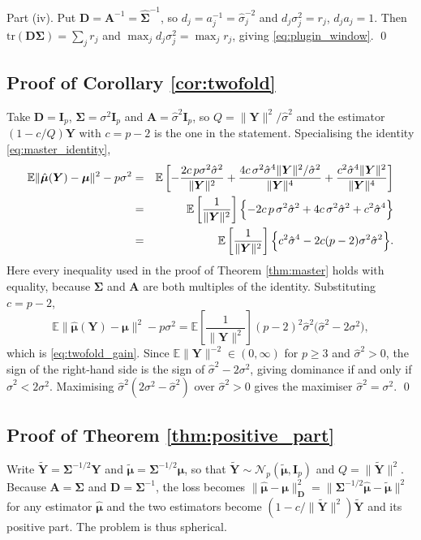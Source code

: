 \documentclass[pdflatex,sn-mathphys-num]{sn-jnl}%
\theoremstyle{thmstyleone}%
\theoremstyle{thmstyletwo}%
\theoremstyle{thmstylethree}%
\newcommand{\tr}{\mathrm{tr}}
\newcommand{\E}{\mathbb{E}}
\begin{document}
\begin{appendices}
Part (iv). Put $\bm D=\bm A^{-1}=\widehat{\bm\Sigma}^{-1}$, so $d_j=a^{-1}_j=\hat\sigma^{-2}_j$ and $d_j\sigma^2_j=r_j$, $d_ja_j=1$. Then $\tr(\bm D\bm\Sigma)=\sum_jr_j$ and $\max_jd_j\sigma^2_j=\max_jr_j$, giving \eqref{eq:plugin_window}. \qed

\subsection*{Proof of Corollary \ref{cor:twofold}}

Take $\bm D=\bm I_p$, $\bm\Sigma=\sigma^2\bm I_p$ and $\bm A=\hat\sigma^2\bm I_p$, so $Q=\|\bm Y\|^2/\hat\sigma^2$ and the estimator $(1-c/Q)\bm Y$ with $c=p-2$ is the one in the statement. Specialising the identity \eqref{eq:master_identity},
\begin{eqnarray}
\E\|\hat{\bm\mu}(\bm Y)-\bm\mu\|^2-p\sigma^2
&=&
\E\left[
-\frac{2c\,p\sigma^2\hat\sigma^2}{\|\bm Y\|^2}
+\frac{4c\,\sigma^2\hat\sigma^{4}\|\bm Y\|^2/\hat\sigma^2}{\|\bm Y\|^{4}}
+\frac{c^{2}\hat\sigma^{4}\|\bm Y\|^2}{\|\bm Y\|^{4}}
\right]
\cr
&=&
\E\left[\frac{1}{\|\bm Y\|^2}\right]
\Bigl\{
-2c\,p\,\sigma^2\hat\sigma^2+4c\,\sigma^2\hat\sigma^2+c^{2}\hat\sigma^{4}
\Bigr\}
\cr
&=&
\E\left[\frac{1}{\|\bm Y\|^2}\right]
\Bigl\{
c^{2}\hat\sigma^{4}-2c(p-2)\sigma^2\hat\sigma^2
\Bigr\}.
\end{eqnarray}
Here every inequality used in the proof of Theorem \ref{thm:master} holds with equality, because $\bm\Sigma$ and $\bm A$ are both multiples of the identity. Substituting $c=p-2$,
\begin{equation}
\E\|\hat{\bm\mu}(\bm Y)-\bm\mu\|^2-p\sigma^2
=
\E\left[\frac{1}{\|\bm Y\|^2}\right]
(p-2)^2\hat\sigma^2\bigl(\hat\sigma^2-2\sigma^2\bigr),
\end{equation}
which is \eqref{eq:twofold_gain}. Since $\E\|\bm Y\|^{-2}\in(0,\infty)$ for $p\ge3$ and $\hat\sigma^2>0$, the sign of the right-hand side is the sign of $\hat\sigma^2-2\sigma^2$, giving dominance if and only if $\hat\sigma^2<2\sigma^2$. Maximising $\hat\sigma^2(2\sigma^2-\hat\sigma^2)$ over $\hat\sigma^2>0$ gives the maximiser $\hat\sigma^2=\sigma^2$. \qed

\subsection*{Proof of Theorem \ref{thm:positive_part}}

Write $\widetilde{\bm Y}=\bm\Sigma^{-1/2}\bm Y$ and $\widetilde{\bm\mu}=\bm\Sigma^{-1/2}\bm\mu$, so that $\widetilde{\bm Y}\sim\mathcal N_p(\widetilde{\bm\mu},\bm I_p)$ and $Q=\|\widetilde{\bm Y}\|^2$. Because $\bm A=\bm\Sigma$ and $\bm D=\bm\Sigma^{-1}$, the loss becomes $\|\hat{\bm\mu}-\bm\mu\|^2_{\bm D}=\|\bm\Sigma^{-1/2}\hat{\bm\mu}-\widetilde{\bm\mu}\|^2$ for any estimator $\hat{\bm\mu}$ and the two estimators become $(1-c/\|\widetilde{\bm Y}\|^2)\widetilde{\bm Y}$ and its positive part. The problem is thus spherical.


\end{appendices}
\end{document}
